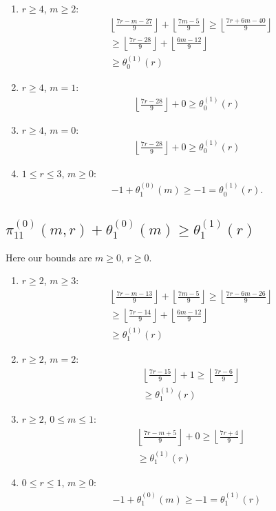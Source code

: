 \documentclass[reqno]{amsart}
\theoremstyle{definition}
\theoremstyle{remark}
\numberwithin{equation}{section}
\begin{document}
\begin{enumerate}
\item $r\ge 4$, $m\ge 2$:
\begin{align*}
&\left\lfloor \frac{7r-m-27}{9} \right\rfloor + \left\lfloor \frac{7m-5}{9} \right\rfloor\ge \left\lfloor \frac{7r+6m-40}{9} \right\rfloor\\
&\ge\left\lfloor \frac{7r-28}{9} \right\rfloor + \left\lfloor \frac{6m-12}{9} \right\rfloor\\
&\ge \theta^{(1)}_0(r)
\end{align*}
\item $r\ge 4$, $m=1$:
\begin{align*}
\left\lfloor \frac{7r-28}{9} \right\rfloor + 0\ge \theta^{(1)}_0(r)
\end{align*}
\item $r\ge 4$, $m=0$:
\begin{align*}
\left\lfloor \frac{7r-28}{9} \right\rfloor + 0 \ge \theta^{(1)}_0(r)
\end{align*}
\item $1\le r\le 3$, $m\ge 0$:
\begin{align*}
-1 + \theta^{(0)}_1(m)\ge -1 = \theta^{(1)}_0(r).
\end{align*}
\end{enumerate}

\subsection{$\displaystyle{\pi^{(0)}_{11}(m,r)+\theta^{(0)}_1(m)\ge\theta^{(1)}_1(r)}$}

Here our bounds are $m\ge 0$, $r\ge 0$.\\

\begin{enumerate}
\item $r\ge 2$, $m\ge 3$:
\begin{align*}
&\left\lfloor \frac{7r-m-13}{9} \right\rfloor + \left\lfloor \frac{7m-5}{9} \right\rfloor\ge \left\lfloor \frac{7r-6m-26}{9} \right\rfloor\\
&\ge\left\lfloor \frac{7r-14}{9} \right\rfloor + \left\lfloor \frac{6m-12}{9} \right\rfloor\\
&\ge\theta^{(1)}_1(r)
\end{align*}
\item $r\ge 2$, $m=2$:
\begin{align*}
&\left\lfloor \frac{7r-15}{9} \right\rfloor + 1\ge \left\lfloor \frac{7r-6}{9} \right\rfloor\\
&\ge\theta^{(1)}_1(r)
\end{align*}
\item $r\ge 2$, $0\le m\le 1$:
\begin{align*}
&\left\lfloor \frac{7r-m+5}{9} \right\rfloor + 0\ge \left\lfloor \frac{7r+4}{9} \right\rfloor\\
&\ge \theta^{(1)}_1(r)
\end{align*}
\item $0\le r\le 1$, $m\ge 0$:
\begin{align*}
-1 + \theta^{(0)}_1(m)\ge -1 = \theta^{(1)}_1(r)
\end{align*}
\end{enumerate}
\end{document}
